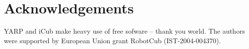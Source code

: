
\section{Acknowledgements}

YARP and iCub make heavy use of free sofware -- thank
you world.  The authors were supported by European Union
grant RobotCub (IST-2004-004370).




